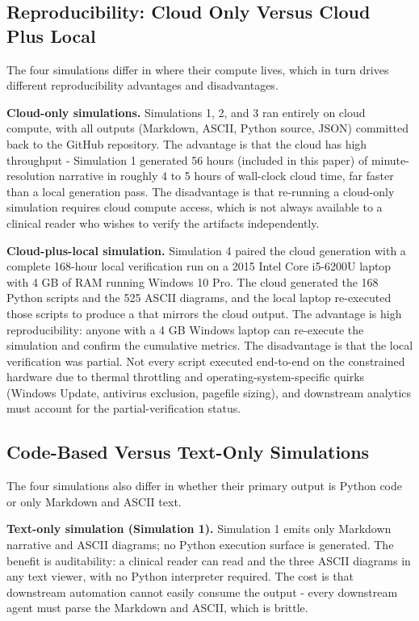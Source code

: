 \subsection{Reproducibility: Cloud Only Versus Cloud Plus Local}
\label{sec:methods-reproducibility}

The four simulations differ in where their compute lives, which in
turn drives different reproducibility advantages and disadvantages.

\textbf{Cloud-only simulations.} Simulations 1, 2, and 3 ran entirely
on cloud compute, with all outputs (Markdown, ASCII, Python source,
JSON) committed back to the GitHub repository. The advantage is that
the cloud has high throughput - Simulation 1 generated 56 hours
(included in this paper) of minute-resolution narrative in roughly 4
to 5 hours of wall-clock cloud time, far faster than a local
generation pass. The disadvantage is that re-running a cloud-only
simulation requires cloud compute access, which is not always
available to a clinical reader who wishes to verify the artifacts
independently.

\textbf{Cloud-plus-local simulation.} Simulation 4 paired the cloud
generation with a complete 168-hour local verification run on a 2015
Intel Core i5-6200U laptop with 4 GB of RAM running Windows 10 Pro.
The cloud generated the 168 Python scripts and the 525 ASCII diagrams,
and the local laptop re-executed those scripts to produce a
 that mirrors the cloud output. The
advantage is high reproducibility: anyone with a 4 GB Windows laptop
can re-execute the simulation and confirm the cumulative metrics. The
disadvantage is that the local verification was partial. Not every
script executed end-to-end on the constrained hardware due to thermal
throttling and operating-system-specific quirks (Windows Update,
antivirus exclusion, pagefile sizing), and downstream analytics must
account for the partial-verification status.

\subsection{Code-Based Versus Text-Only Simulations}
\label{sec:methods-code-vs-text}

The four simulations also differ in whether their primary output is
Python code or only Markdown and ASCII text.

\textbf{Text-only simulation (Simulation 1).} Simulation 1 emits only
Markdown narrative and ASCII diagrams; no Python execution surface is
generated. The benefit is auditability: a clinical reader can read
 and the three ASCII diagrams in any text
viewer, with no Python interpreter required. The cost is that
downstream automation cannot easily consume the output - every
downstream agent must parse the Markdown and ASCII, which is brittle.

